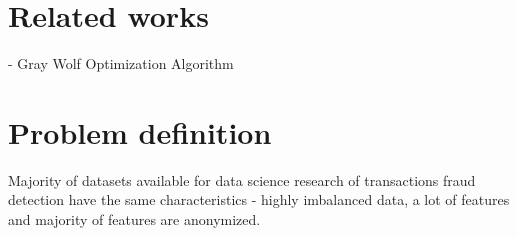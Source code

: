 \documentclass[runningheads]{llncs}
\begin{document}


\section{Related works}




- Gray Wolf Optimization Algorithm \cite{Mirjalili_Mirjalili_Lewis_2014}

\section{Problem definition}



Majority of datasets available for data science research of transactions fraud detection have the same characteristics - highly imbalanced data, a lot of features and majority of features are anonymized.
\end{document}
